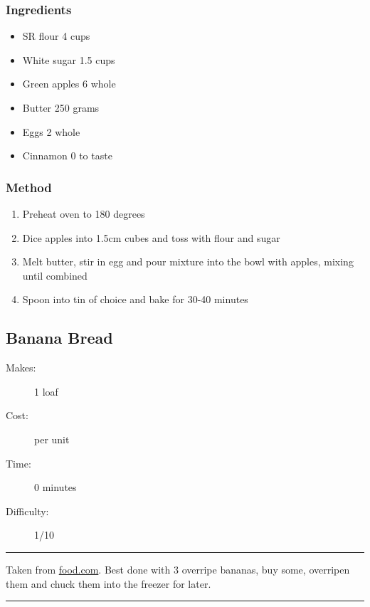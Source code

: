 \documentclass[]{article}
\begin{document}
\subsubsection*{\Large Ingredients}
\begin{multicols}{2}
\begin{itemize}
 \item SR flour \hfill 4 cups
 \item White sugar \hfill 1.5 cups
 \item Green apples \hfill 6 whole
 \item Butter \hfill 250 grams
 \item Eggs \hfill 2 whole
 \item Cinnamon \hfill 0 to taste
\end{itemize}
\end{multicols}
\subsubsection*{\Large Method}
\begin{enumerate}[font=\huge\color{accent}]
	\item Preheat oven to 180 degrees
	\item Dice apples into 1.5cm cubes and toss with flour and sugar
	\item Melt butter, stir in egg and pour mixture into the bowl with apples, mixing until combined
	\item Spoon into tin of choice and bake for 30-40 minutes
\end{enumerate}
\newpage
{}\label{rec:Banana Bread}
\subsection*{\center\huge Banana Bread}
\begin{description}
\item[Makes:] 1 loaf
\item[Cost:]  per unit
\item[Time:] 0 minutes
\item[Difficulty:] 1/10
\end{description}
\vspace{0.2cm}\hrule\vspace{0.5cm}
\begin{adjustwidth}{0.5 cm}{0.5 cm}

Taken from \href{https://www.food.com/recipe/best-banana-bread-2886}{food.com}. Best done with 3 overripe bananas, buy some, overripen them and chuck them into the freezer for later. \hfill{}\color{black}

\end{adjustwidth}
\vspace{0.5cm}\hrule
\end{document}
